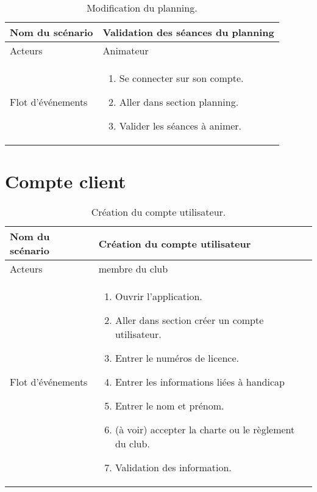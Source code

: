 \documentclass{report}
\begin{document}
\begin{table}[htbp]
\begin{center}
\begin{tabular}{|L{4cm}||L{10cm}|}
\hline Nom du scénario &  Validation des séances du planning \\
\hline  Acteurs &  Animateur \\
\hline  Flot d'événements &  \begin{enumerate}
\item Se connecter sur son compte.
\item Aller dans section planning.
\item Valider les séances à animer.
\end{enumerate}\\
\hline
\end{tabular}
\caption{Modification du planning.\label{creatplan}}
\end{center}
\end{table}

\section{Compte client}
\begin{table}[htbp]
\begin{center}
\begin{tabular}{|L{4cm}||L{10cm}|}
\hline Nom du scénario & Création du compte utilisateur \\
\hline  Acteurs &  membre du club \\
\hline  Flot d'événements &  \begin{enumerate}
\item Ouvrir l'application.
\item Aller dans section créer un compte utilisateur.
\item Entrer le numéros de licence.
\item Entrer les informations liées à handicap 
\item Entrer le nom et prénom.
\item (à voir) accepter la charte ou le règlement du club.
\item Validation des information.
\end{enumerate} \\
\hline
\end{tabular}
\caption{Création du compte utilisateur.\label{creamembre}}
\end{center}
\end{table}
\end{document}
